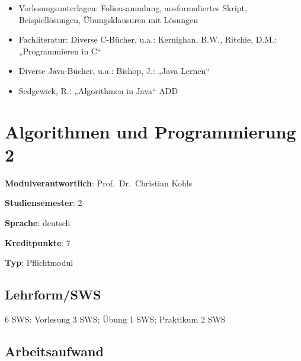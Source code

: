 \begin{itemize}
\tightlist
\item
  Vorlesungsunterlagen: Foliensammlung, ausformuliertes Skript,
  Beispiellösungen, Übungsklausuren mit Lösungen
\item
  Fachliteratur: Diverse C-Bücher, u.a.: Kernighan, B.W., Ritchie, D.M.:
  „Programmieren in C``
\item
  Diverse Java-Bücher, u.a.: Bishop, J.: „Java Lernen``
\item
  Sedgewick, R.: „Algorithmen in Java`` ADD
\end{itemize}

\hypertarget{algorithmen-und-programmierung-2pathlabelmi-2017modulbeschreibungen-bachelorba_algorithmenundprogrammierung2}{%
\chapter{Algorithmen und Programmierung
2\label{/mi-2017/modulbeschreibungen-bachelor/BA_AlgorithmenundProgrammierung2}}\label{algorithmen-und-programmierung-2pathlabelmi-2017modulbeschreibungen-bachelorba_algorithmenundprogrammierung2}}

\begin{modulHead}
\textbf{Modulverantwortlich}: Prof.~Dr.~Christian
Kohls
\end{modulHead}
\begin{modulHead}
\textbf{Studiensemester}:
2
\end{modulHead}
\begin{modulHead}
\textbf{Sprache}:
deutsch
\end{modulHead}
\begin{modulHead}
\textbf{Kreditpunkte}:
7
\end{modulHead}
\begin{modulHead}
\textbf{Typ}:
Pflichtmodul
\end{modulHead}


\hypertarget{lehrformswspathlabelmi-2017modulbeschreibungen-bachelorba_algorithmenundprogrammierung2}{%
\section*{Lehrform/SWS\label{/mi-2017/modulbeschreibungen-bachelor/BA_AlgorithmenundProgrammierung2}}\label{lehrformswspathlabelmi-2017modulbeschreibungen-bachelorba_algorithmenundprogrammierung2}}

6 SWS: Vorlesung 3 SWS; Übung 1 SWS; Praktikum 2 SWS

\hypertarget{arbeitsaufwandpathlabelmi-2017modulbeschreibungen-bachelorba_algorithmenundprogrammierung2}{%
\section*{Arbeitsaufwand\label{/mi-2017/modulbeschreibungen-bachelor/BA_AlgorithmenundProgrammierung2}}\label{arbeitsaufwandpathlabelmi-2017modulbeschreibungen-bachelorba_algorithmenundprogrammierung2}}

